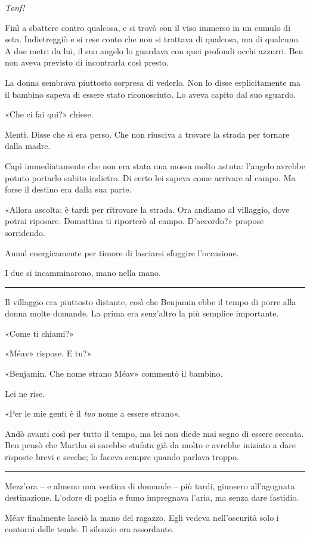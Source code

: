 \emph{Tonf!}

Finì a sbattere contro qualcosa, e si trovò con il viso immerso in un cumulo di seta. Indietreggiò e
si rese conto che non si trattava di qualcosa, ma di qualcuno. A due metri da lui, il suo angelo lo
guardava con quei profondi occhi azzurri. Ben non aveva previsto di incontrarla così presto.

La donna sembrava piuttosto sorpresa di vederlo. Non lo disse esplicitamente ma il bambino sapeva di
essere stato riconosciuto. Lo aveva capito dal suo sguardo.

«Che ci fai qui?» chiese.

Mentì. Disse che si era perso. Che non riusciva a trovare la strada per tornare dalla madre.

Capì immediatamente che non era stata una mossa molto astuta: l'angelo avrebbe potuto portarlo
subito indietro. Di certo lei sapeva come arrivare al campo. Ma forse il destino era dalla sua
parte.

«Allora ascolta: è tardi per ritrovare la strada. Ora andiamo al villaggio, dove potrai riposare.
Domattina ti riporterò al campo. D'accordo?» propose sorridendo.

Annuì energicamente per timore di lasciarsi sfuggire l'occasione.

I due si incamminarono, mano nella mano.

\plainbreak{1}

Il villaggio era piuttosto distante, così che Benjamin ebbe il tempo di porre alla donna molte
domande. La prima era senz'altro la più semplice importante.

«Come ti chiami?»

«Méav» rispose. E tu?»

«Benjamin. Che nome strano Méav» commentò il bambino.

Lei ne rise.

«Per le mie genti è il \emph{tuo} nome a essere strano».

Andò avanti così per tutto il tempo, ma lei non diede mai segno di essere seccata. Ben pensò che
Martha si sarebbe stufata già da molto e avrebbe iniziato a dare risposte brevi e secche; lo faceva
sempre quando parlava troppo.

\plainbreak{1}

Mezz'ora -- e almeno una ventina di domande -- più tardi, giunsero all'agognata destinazione.
L'odore di paglia e fumo impregnava l'aria, ma senza dare fastidio.

Méav finalmente lasciò la mano del ragazzo. Egli vedeva nell'oscurità solo i contorni delle tende.
Il silenzio era assordante.

